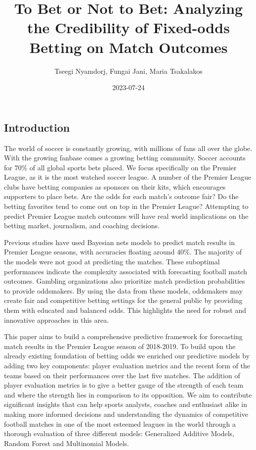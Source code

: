 \documentclass[
]{article}
\title{To Bet or Not to Bet: Analyzing the Credibility of Fixed-odds
Betting on Match Outcomes}
\author{Tseegi Nyamdorj, Fungai Jani, Maria Tsakalakos}
\date{2023-07-24}
\begin{document}
\maketitle

{
\setcounter{tocdepth}{2}
\tableofcontents
}
\hypertarget{introduction}{%
\subsection{Introduction}\label{introduction}}

The world of soccer is constantly growing, with millions of fans all
over the globe. With the growing fanbase comes a growing betting
community. Soccer accounts for 70\% of all global sports bets placed. We
focus specifically on the Premier League, as it is the most watched
soccer league. A number of the Premier League clubs have betting
companies as sponsors on their kits, which encourages supporters to
place bets. Are the odds for each match's outcome fair? Do the betting
favorites tend to come out on top in the Premier League? Attempting to
predict Premier League match outcomes will have real world implications
on the betting market, journalism, and coaching decisions.

Previous studies have used Bayesian nets models to predict match results
in Premier League seasons, with accuracies floating around 40\%. The
majority of the models were not good at predicting the matches. These
suboptimal performances indicate the complexity associated with
forecasting football match outcomes. Gambling organizations also
prioritize match prediction probabilities to provide oddsmakers. By
using the data from these models, oddsmakers may create fair and
competitive betting settings for the general public by providing them
with educated and balanced odds. This highlights the need for robust and
innovative approaches in this area.

This paper aims to build a comprehensive predictive framework for
forecasting match results in the Premier League season of 2018-2019. To
build upon the already existing foundation of betting odds we enriched
our predictive models by adding two key components: player evaluation
metrics and the recent form of the teams based on their performances
over the last five matches. The addition of player evaluation metrics is
to give a better gauge of the strength of each team and where the
strength lies in comparison to its opposition. We aim to contribute
significant insights that can help sports analysts, coaches and
enthusiast alike in making more informed decisions and understanding the
dynamics of competitive football matches in one of the most esteemed
leagues in the world through a thorough evaluation of three different
models: Generalized Additive Models, Random Forest and Multinomial
Models.
\end{document}

